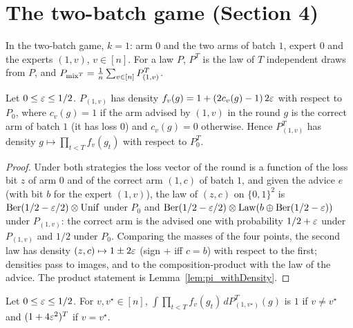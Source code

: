 \chapter{The two-batch game (Section 4)}
\label{chap:two_batch}

In the two-batch game, $k = 1$: arm $0$ and the two arms of batch $1$, expert $0$ and the experts
$(1, v)$, $v \in [n]$. For a law $P$, $P^T$ is the law of $T$ independent draws from $P$, and
$P_{\mathrm{mix}^T} = \frac1n \sum_{v \in [n]} P_{(1,v)}^T$.

\begin{lemma}
  \label{lem:roundLaw_withDensity}
  \leanok
  Let $0 \le \varepsilon \le 1/2$. $P_{(1,v)}$ has density $f_v(g) = 1 + (2 c_v(g) - 1)\, 2\varepsilon$ with
  respect to $P_0$, where $c_v(g) = 1$ if the arm advised by $(1, v)$ in the round $g$ is the
  correct arm of batch $1$ (it has loss $0$) and $c_v(g) = 0$ otherwise. Hence $P_{(1,v)}^T$ has
  density $g \mapsto \prod_{t < T} f_v(g_t)$ with respect to $P_0^T$.
\end{lemma}

\begin{proof}
  \leanok
  Under both strategies the loss vector of the round is a function of the loss bit $z$ of arm $0$
  and of the correct arm $(1, c)$ of batch $1$, and given the advice $e$ (with bit $b$ for the
  expert $(1, v)$), the law of $(z, c)$ on $\{0, 1\}^2$ is $\mathrm{Ber}(1/2 - \varepsilon/2) \otimes
  \mathrm{Unif}$ under $P_0$ and $\mathrm{Ber}(1/2 - \varepsilon/2) \otimes \mathrm{Law}(b \oplus \mathrm{Ber}(1/2 -
  \varepsilon))$ under $P_{(1,v)}$: the correct arm is the advised one with probability $1/2 + \varepsilon$
  under $P_{(1,v)}$ and $1/2$ under $P_0$. Comparing the masses of the four points, the second
  law has density $(z, c) \mapsto 1 \pm 2\varepsilon$ (sign $+$ iff $c = b$) with respect to the first;
  densities pass to images, and to the composition-product with the law of the advice. The
  product statement is Lemma~\ref{lem:pi_withDensity}.
\end{proof}

\begin{lemma}
  \label{lem:integral_ratio}
  \leanok
  Let $0 \le \varepsilon \le 1/2$. For $v, v^\star \in [n]$,
  $\int \prod_{t < T} f_v(g_t) \, dP_{(1,v^\star)}^T(g)$ is $1$ if $v \ne v^\star$ and
  $(1 + 4\varepsilon^2)^T$ if $v = v^\star$.
\end{lemma}

